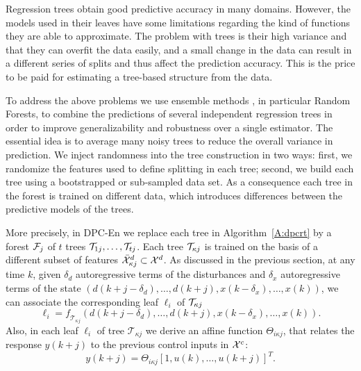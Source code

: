 \label{SS:dpcrf}

\textcolor[rgb]{0,0,1}{Regression trees obtain good predictive accuracy in many domains. However, the models used in their leaves have some limitations regarding the kind of functions they are able to approximate. The problem with trees is their high variance and that they can overfit the data easily, and a small change in the data can result in a different series of splits and thus affect the prediction accuracy. This is the price to be paid for estimating a tree-based structure from the data.}

\textcolor[rgb]{0,0,1}{To address the above problems we use ensemble methods \cite{Friedman2001}, in particular Random Forests, to combine the predictions of several independent regression trees in order to improve generalizability and robustness over a single estimator. The essential idea is to average many noisy trees to reduce the overall variance in prediction. We inject randomness into the tree construction in two ways: first, we randomize the features used to define splitting in each tree; second, we build each tree using a bootstrapped or sub-sampled data set. As a consequence each tree in the forest is trained on different data, which introduces differences between the predictive models of the trees.}

\textcolor[rgb]{0,0,1}{More precisely, in DPC-En we replace each tree in Algorithm~\ref{A:dpcrt} by a forest $\mathcal{F}_j$ of $t$ trees $\mathcal{T}_{1j},\ldots,\mathcal{T}_{tj}$. Each tree $\mathcal{T}_{\kappa j}$ is trained on the basis of a different subset of features $\bar{\mathcal{X}}^d_{\kappa j} \subset \mathcal{X}^d$. As discussed in the previous section, at any time $k$, given $\delta_d$ autoregressive terms of the disturbances and $\delta_x$ autoregressive terms of the state $\left( d(k+j-\delta_d),\ldots,d(k+j),x(k-\delta_x),\ldots,x(k) \right)$, we can associate the corresponding leaf $\ell_i$ of $\mathcal{T}_{\kappa j}$
\begin{equation}\label{E:model_forest}
	\ell_i = \mathit{f}_{\mathcal{T}_{\kappa j}} \left( d(k+j-\delta_d),\ldots,d(k+j),x(k-\delta_x),\ldots,x(k)  \right).
\end{equation}
Also, in each leaf $\ell_i$ of tree $\mathcal{T}_{\kappa j}$ we derive an affine function $\Theta_{i \kappa j}$, that relates the response $y(k+j)$ to the previous control inputs in $\mathcal{X}^c$:
\begin{equation}\label{E:model_leaf_forest}
	y(k+j) =  \Theta_{i \kappa j} [1,u(k),\ldots,u(k+j) ]^T.
\end{equation}
}

